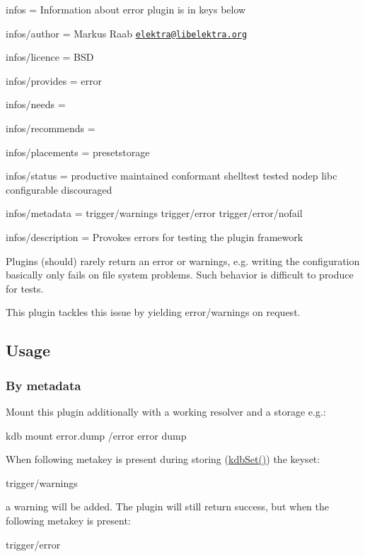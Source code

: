 
\begin{DoxyItemize}
\item infos = Information about error plugin is in keys below
\item infos/author = Markus Raab \href{mailto:elektra@libelektra.org}{\tt elektra@libelektra.\+org}
\item infos/licence = B\+SD
\item infos/provides = error
\item infos/needs =
\item infos/recommends =
\item infos/placements = presetstorage
\item infos/status = productive maintained conformant shelltest tested nodep libc configurable discouraged
\item infos/metadata = trigger/warnings trigger/error trigger/error/nofail
\item infos/description = Provokes errors for testing the plugin framework
\end{DoxyItemize}

Plugins (should) rarely return an error or warnings, e.\+g. writing the configuration basically only fails on file system problems. Such behavior is difficult to produce for tests.

This plugin tackles this issue by yielding error/warnings on request.

\subsection*{Usage}

\subsubsection*{By metadata}

Mount this plugin additionally with a working resolver and a storage e.\+g.\+: \begin{DoxyVerb}kdb mount error.dump /error error dump
\end{DoxyVerb}


When following metakey is present during storing ({\ttfamily \hyperlink{group__kdb_ga11436b058408f83d303ca5e996832bcf}{kdb\+Set()}}) the keyset\+: \begin{DoxyVerb}trigger/warnings
\end{DoxyVerb}


a warning will be added. The plugin will still return success, but when the following metakey is present\+: \begin{DoxyVerb}trigger/error
\end{DoxyVerb}


